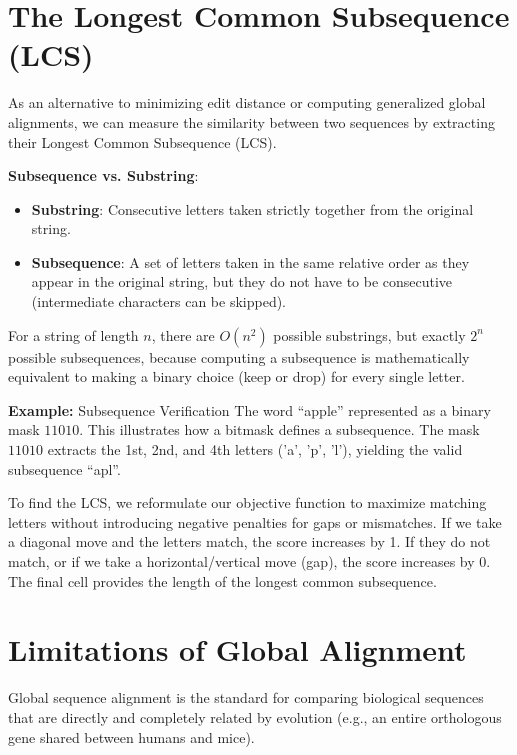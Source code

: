 \section{The Longest Common Subsequence (LCS)}

As an alternative to minimizing edit distance or computing generalized global alignments, we can measure the similarity between two sequences by extracting their Longest Common Subsequence (LCS).

\begin{important}
    \textbf{Subsequence vs. Substring}:
    \begin{itemize}
        \item \textbf{Substring}: Consecutive letters taken strictly together from the original string.
        \item \textbf{Subsequence}: A set of letters taken in the same relative order as they appear in the original string, but they do not have to be consecutive (intermediate characters can be skipped).
    \end{itemize}
\end{important}

For a string of length $n$, there are $O(n^2)$ possible substrings, but exactly $2^n$ possible subsequences, because computing a subsequence is mathematically equivalent to making a binary choice (keep or drop) for every single letter.

\textbf{Example:} Subsequence Verification
The word ``apple'' represented as a binary mask $11010$.
This illustrates how a bitmask defines a subsequence.
The mask $11010$ extracts the 1st, 2nd, and 4th letters ('a', 'p', 'l'), yielding the valid subsequence ``apl''.

To find the LCS, we reformulate our objective function to maximize matching letters without introducing negative penalties for gaps or mismatches. If we take a diagonal move and the letters match, the score increases by 1. If they do not match, or if we take a horizontal/vertical move (gap), the score increases by 0. The final cell provides the length of the longest common subsequence.

\section{Limitations of Global Alignment}

Global sequence alignment is the standard for comparing biological sequences that are directly and completely related by evolution (e.g., an entire orthologous gene shared between humans and mice). 

